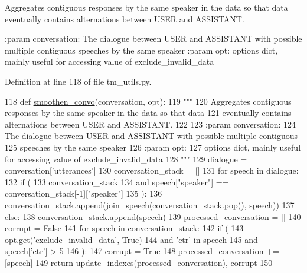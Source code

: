 \begin{DoxyVerb}Aggregates contiguous responses by the same speaker in the data so that data
eventually contains alternations between USER and ASSISTANT.

:param conversation:
    The dialogue between USER and ASSISTANT with possible multiple contiguous
    speeches by the same speaker
:param opt:
    options dict, mainly useful for accessing value of exclude_invalid_data
\end{DoxyVerb}
 

Definition at line 118 of file tm\+\_\+utils.\+py.


\begin{DoxyCode}
118 \textcolor{keyword}{def }\hyperlink{namespaceparlai_1_1tasks_1_1taskmaster_1_1tm__utils_ad9cc917cf497b3cd81ccb76a719cf1b7}{smoothen\_convo}(conversation, opt):
119     \textcolor{stringliteral}{"""}
120 \textcolor{stringliteral}{    Aggregates contiguous responses by the same speaker in the data so that data}
121 \textcolor{stringliteral}{    eventually contains alternations between USER and ASSISTANT.}
122 \textcolor{stringliteral}{}
123 \textcolor{stringliteral}{    :param conversation:}
124 \textcolor{stringliteral}{        The dialogue between USER and ASSISTANT with possible multiple contiguous}
125 \textcolor{stringliteral}{        speeches by the same speaker}
126 \textcolor{stringliteral}{    :param opt:}
127 \textcolor{stringliteral}{        options dict, mainly useful for accessing value of exclude\_invalid\_data}
128 \textcolor{stringliteral}{    """}
129     dialogue = conversation[\textcolor{stringliteral}{'utterances'}]
130     conversation\_stack = []
131     \textcolor{keywordflow}{for} speech \textcolor{keywordflow}{in} dialogue:
132         \textcolor{keywordflow}{if} (
133             conversation\_stack
134             \textcolor{keywordflow}{and} speech[\textcolor{stringliteral}{"speaker"}] == conversation\_stack[-1][\textcolor{stringliteral}{"speaker"}]
135         ):
136             conversation\_stack.append(\hyperlink{namespaceparlai_1_1tasks_1_1taskmaster_1_1tm__utils_ad5d13cd462bd26919f078aa93174e9cd}{join\_speech}(conversation\_stack.pop(), speech))
137         \textcolor{keywordflow}{else}:
138             conversation\_stack.append(speech)
139     processed\_conversation = []
140     corrupt = \textcolor{keyword}{False}
141     \textcolor{keywordflow}{for} speech \textcolor{keywordflow}{in} conversation\_stack:
142         \textcolor{keywordflow}{if} (
143             opt.get(\textcolor{stringliteral}{'exclude\_invalid\_data'}, \textcolor{keyword}{True})
144             \textcolor{keywordflow}{and} \textcolor{stringliteral}{'ctr'} \textcolor{keywordflow}{in} speech
145             \textcolor{keywordflow}{and} speech[\textcolor{stringliteral}{'ctr'}] > 5
146         ):
147             corrupt = \textcolor{keyword}{True}
148         processed\_conversation += [speech]
149     \textcolor{keywordflow}{return} \hyperlink{namespaceparlai_1_1tasks_1_1taskmaster_1_1tm__utils_ad0c8c99eb4b5152ca8cec2a8fe7895fd}{update\_indexes}(processed\_conversation), corrupt
150 \end{DoxyCode}

